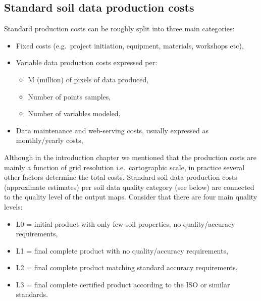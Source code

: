 \documentclass[graybox,natbib,nospthms,UStrade]{svmono}
\providecommand{\tightlist}{%
  \setlength{\itemsep}{0pt}\setlength{\parskip}{0pt}}
\providecommand{\tightlist}{\setlength{\itemsep}{0pt}\setlength{\parskip}{0pt}}
\begin{document}
\hypertarget{standard-soil-data-production-costs}{%
\subsection{Standard soil data production costs}\label{standard-soil-data-production-costs}}

Standard production costs can be roughly split into three main
categories:

\begin{itemize}
\item
  Fixed costs (e.g.~project initiation, equipment, materials,
  workshops etc),
\item
  Variable data production costs expressed per:

  \begin{itemize}
  \tightlist
  \item
    M (million) of pixels of data produced,
  \item
    Number of points samples,
  \item
    Number of variables modeled,
  \end{itemize}
\item
  Data maintenance and web-serving costs, usually expressed as
  monthly/yearly costs,
\end{itemize}

Although in the introduction chapter we mentioned that the production costs are mainly a function of
grid resolution i.e.~cartographic scale, in practice several other factors determine the total costs.
Standard soil data production costs (approximate estimates) per
soil data quality category (see below) are connected to the quality level of the output maps.
Consider that there are four main quality levels:

\begin{itemize}
\item
  L0 = initial product with only few soil properties, no quality/accuracy requirements,
\item
  L1 = final complete product with no quality/accuracy requirements,
\item
  L2 = final complete product matching standard accuracy requirements,
\item
  L3 = final complete certified product according to the ISO or similar standards.
\end{itemize}
\end{document}
